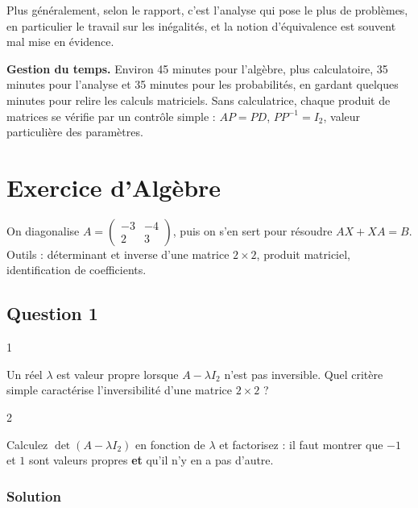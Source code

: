 \documentclass[11pt,a4paper]{article}
\begin{document}
Plus généralement, selon le rapport, c'est l'analyse qui pose le plus de problèmes, en particulier le travail sur les inégalités, et la notion d'équivalence est souvent mal mise en évidence.

\textbf{Gestion du temps.} Environ 45 minutes pour l'algèbre, plus calculatoire, 35 minutes pour l'analyse et 35 minutes pour les probabilités, en gardant quelques minutes pour relire les calculs matriciels. Sans calculatrice, chaque produit de matrices se vérifie par un contrôle simple : \(AP=PD\), \(PP^{-1}=I_2\), valeur particulière des paramètres.

\hypertarget{exercice-dalguxe8bre}{%
\section{Exercice d'Algèbre}\label{exercice-dalguxe8bre}}

On diagonalise \(A=\begin{pmatrix}-3&-4\\2&3\end{pmatrix}\), puis on s'en sert pour résoudre \(AX+XA=B\). Outils : déterminant et inverse d'une matrice \(2\times2\), produit matriciel, identification de coefficients.

\hypertarget{question-1}{%
\subsection{Question 1}\label{question-1}}

\begin{indication}{1}

Un réel \(\lambda\) est valeur propre lorsque \(A-\lambda I_2\) n'est pas inversible. Quel critère simple caractérise l'inversibilité d'une matrice \(2\times2\) ?

\end{indication}

\begin{indication}{2}

Calculez \(\det(A-\lambda I_2)\) en fonction de \(\lambda\) et factorisez : il faut montrer que \(-1\) et \(1\) sont valeurs propres \textbf{et} qu'il n'y en a pas d'autre.

\end{indication}

\hypertarget{solution}{%
\subsubsection{Solution}\label{solution}}
\end{document}
